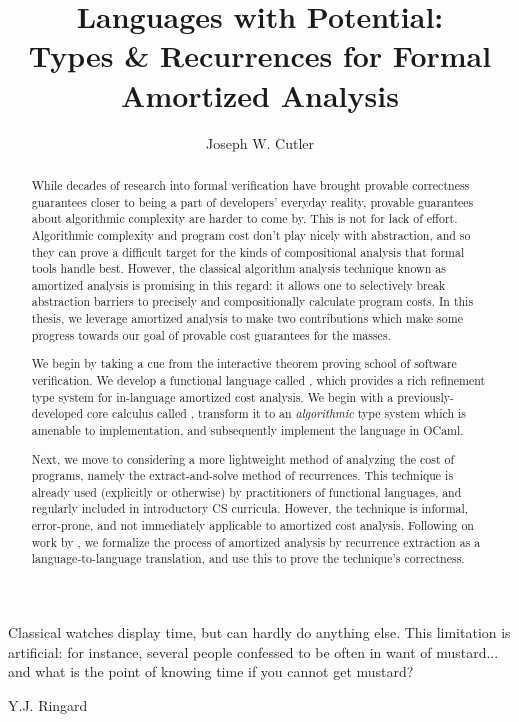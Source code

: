 \documentclass[final]{westhesis}
\title{\LARGE{Languages with Potential:}\\
Types \& Recurrences for Formal Amortized Analysis}
\author{Joseph W. Cutler}
\begin{document}
\begin{abstract}
While decades of research into formal verification have brought provable correctness guarantees closer to being a part of developers' everyday reality, provable guarantees about algorithmic complexity are harder to come by. This is not for lack of effort. Algorithmic complexity and program cost don't play nicely with abstraction, and so they can prove a difficult target for the kinds of compositional analysis that formal tools handle best. However, the classical algorithm analysis technique known as amortized analysis \cite{tarjan:amortized-complexity} is promising in this regard: it allows one to selectively break abstraction barriers to precisely and compositionally calculate program costs. In this thesis, we leverage amortized analysis to make two contributions which make some progress towards our goal of provable cost guarantees for the masses.

We begin by taking a cue from the interactive theorem proving school of software verification. We develop a functional language called \lambdaamorimpl, which provides a rich refinement type system for in-language amortized cost analysis. We begin with a previously-developed core calculus called \lambdaamor \cite{rajani-et-al:popl21}, transform it to an \textit{algorithmic} type system which is amenable to implementation, and subsequently implement the language in OCaml.

Next, we move to considering a more lightweight method of analyzing the cost of programs, namely the extract-and-solve method of recurrences. This technique is already used (explicitly or otherwise) by practitioners of functional languages, and regularly included in introductory CS curricula. However, the technique is informal, error-prone, and not immediately applicable to amortized cost analysis. Following on work by \citet{danner-et-al:icfp15}, we formalize the process of amortized analysis by recurrence extraction as a language-to-language translation, and use this to prove the technique's correctness.
\end{abstract}


\begin{dedication}
\epigraph{Classical watches display time, but can hardly do anything else. This limitation is artificial: for instance, several people confessed to be often in want of mustard... and what is the point of knowing time if you cannot get mustard?}{Y.J. Ringard \cite{mustard-watches}}
\end{dedication}
\end{document}
